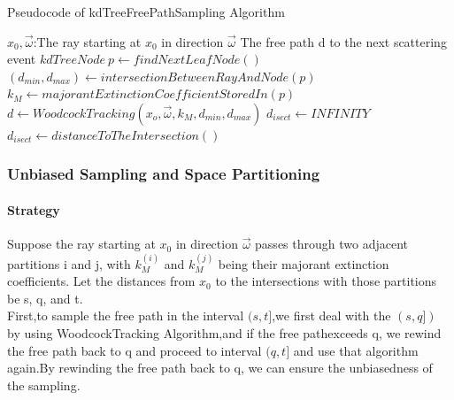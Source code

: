 \documentclass[acmtog]{acmart}
\begin{document}
\begin{algorithm}[h]
	\caption{Pseudocode of kdTreeFreePathSampling Algorithm}
	\begin{algorithmic}[1]
		\Require
		$x_0,\vec{\omega}$:The ray starting at $x_0$ in direction $\vec{\omega}$
		\Ensure
		The free path d to the next scattering event
		\State $kdTreeNode\ p\gets findNextLeafNode()$ 
		\State {} \EndIf
		\State $(d_{min},d_{max})\gets intersectionBetweenRayAndNode(p)$ 
		\State $k_M\gets majorantExtinctionCoefficientStoredIn(p)$ 
		\State $d\gets WoodcockTracking(x_o,\vec{\omega},k_M,d_{min},d_{max})$ 
		\State $d_{isect}\gets INFINITY$
		 \State $d_{isect} \gets distanceToTheIntersection()$ \EndIf
		 \State {} \EndIf
		 \State {} \EndIf
		\EndWhile
	\end{algorithmic}
\end{algorithm}
\subsubsection{Unbiased Sampling and Space Partitioning}
\paragraph{\textbf{Strategy}}
Suppose the ray starting at $x_0$ in direction $\vec{\omega}$ passes through two adjacent partitions i and j, with $k_M^{(i)}$ and $k_M^{(j)}$ being their majorant extinction coefficients. Let the distances from $x_0$ to the intersections with those partitions be s, q, and t.\\
First,to sample the free path in the interval $(s,t]$,we first deal with the $(s,q])$ by using WoodcockTracking Algorithm,and if the free pathexceeds q, we rewind the free path back to q and proceed to interval $(q,t]$ and use that algorithm again.By rewinding the free path back to q, we can ensure the unbiasedness of the sampling.
\end{document}
